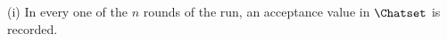
\begin{assumption}\label{ass:alphabet}
(i) In every one of the $n$ rounds of the run, an acceptance value in
$\Chatset$ is recorded.
\end{assumption}
